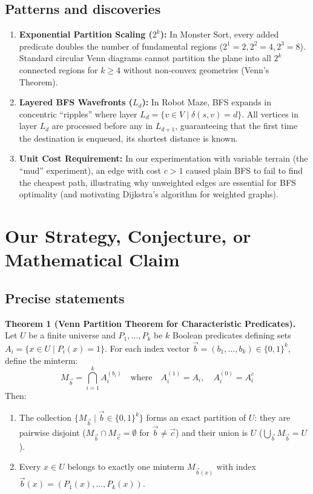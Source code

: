 \documentclass[11pt,a4paper]{article}
\begin{document}
\subsection{Patterns and discoveries}
\begin{enumerate}
  \item \textbf{Exponential Partition Scaling ($2^k$):} In Monster Sort, every added predicate doubles the number of fundamental regions ($2^1 = 2, 2^2 = 4, 2^3 = 8$). Standard circular Venn diagrams cannot partition the plane into all $2^k$ connected regions for $k \ge 4$ without non-convex geometries (Venn's Theorem).
  \item \textbf{Layered BFS Wavefronts ($L_d$):} In Robot Maze, BFS expands in concentric ``ripples'' where layer $L_d = \{v \in V \mid \delta(s, v) = d\}$. All vertices in layer $L_d$ are processed before any in $L_{d+1}$, guaranteeing that the first time the destination is enqueued, its shortest distance is known.
  \item \textbf{Unit Cost Requirement:} In our experimentation with variable terrain (the ``mud'' experiment), an edge with cost $c > 1$ caused plain BFS to fail to find the cheapest path, illustrating why unweighted edges are essential for BFS optimality (and motivating Dijkstra's algorithm for weighted graphs).
\end{enumerate}

\section{Our Strategy, Conjecture, or Mathematical Claim}

\subsection{Precise statements}

\textbf{Theorem 1 (Venn Partition Theorem for Characteristic Predicates).}
Let $U$ be a finite universe and $P_1, \dots, P_k$ be $k$ Boolean predicates defining sets $A_i = \{x \in U \mid P_i(x) = 1\}$. For each index vector $\vec{b} = (b_1, \dots, b_k) \in \{0, 1\}^k$, define the minterm:
\begin{equation}
M_{\vec{b}} = \bigcap_{i=1}^k A_i^{(b_i)} \quad \text{where} \quad A_i^{(1)} = A_i, \quad A_i^{(0)} = A_i^c
\end{equation}
Then:
\begin{enumerate}[label=(\roman*)]
  \item The collection $\{M_{\vec{b}} \mid \vec{b} \in \{0, 1\}^k\}$ forms an exact partition of $U$: they are pairwise disjoint ($M_{\vec{b}} \cap M_{\vec{c}} = \emptyset$ for $\vec{b} \neq \vec{c}$) and their union is $U$ ($\bigcup_{\vec{b}} M_{\vec{b}} = U$).
  \item Every $x \in U$ belongs to exactly one minterm $M_{\vec{b}(x)}$ with index $\vec{b}(x) = (P_1(x), \dots, P_k(x))$.
\end{enumerate}
\end{document}
